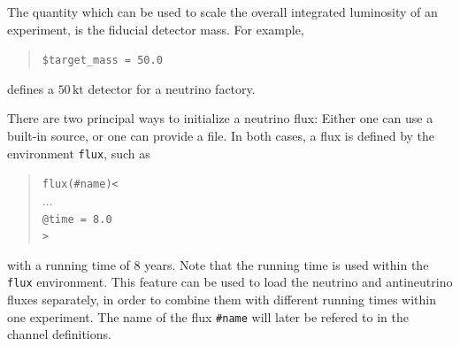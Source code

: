 The quantity which can be used to scale the overall integrated luminosity of an experiment, is the fiducial detector mass. For example,
\begin{quote}
{\tt \$target\_mass = 50.0 }
\end{quote}
defines a $50 \, \mathrm{kt}$ detector for a neutrino factory.

There are two principal ways to initialize a neutrino flux: 
Either one can use 
a built-in source, or one can provide a file. In both cases,
a flux is defined by the environment {\tt flux}, such as
\begin{quote}
  {\tt flux(\#name)<\\
\tb $\ldots$\\
\tb @time = 8.0 \\
>}
\end{quote}
with a running time of $8$ years. Note that the running time is used within
the {\tt flux} environment. This feature can be used to load the neutrino and antineutrino fluxes separately, in order to combine them with different
running times within one experiment. The name of the flux {\tt \#name} will later be refered to in the channel definitions.

